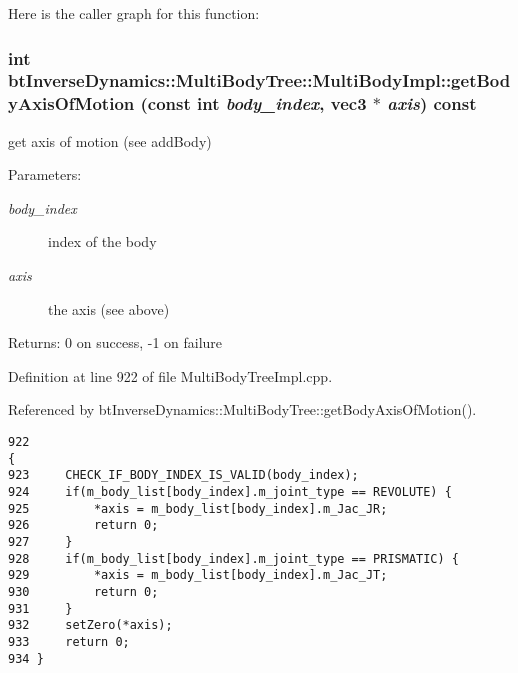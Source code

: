 Here is the caller graph for this function:\hypertarget{classbt_inverse_dynamics_1_1_multi_body_tree_1_1_multi_body_impl_3a0e4f72e0c1f41332e738014fd5f257}{
\subsubsection[getBodyAxisOfMotion]{\setlength{\rightskip}{0pt plus 5cm}int btInverseDynamics::MultiBodyTree::MultiBodyImpl::getBodyAxisOfMotion (const int {\em body\_\-index}, \/  {\bf vec3} $\ast$ {\em axis}) const}}
\label{classbt_inverse_dynamics_1_1_multi_body_tree_1_1_multi_body_impl_3a0e4f72e0c1f41332e738014fd5f257}


get axis of motion (see addBody) \begin{Desc}
\item[Parameters:]
\begin{description}
\item[{\em body\_\-index}]index of the body \item[{\em axis}]the axis (see above) \end{description}
\end{Desc}
\begin{Desc}
\item[Returns:]0 on success, -1 on failure \end{Desc}
 

Definition at line 922 of file MultiBodyTreeImpl.cpp.

Referenced by btInverseDynamics::MultiBodyTree::getBodyAxisOfMotion().

\begin{Code}\begin{verbatim}922                                                                                           {
923     CHECK_IF_BODY_INDEX_IS_VALID(body_index);
924     if(m_body_list[body_index].m_joint_type == REVOLUTE) {
925         *axis = m_body_list[body_index].m_Jac_JR;
926         return 0;
927     }
928     if(m_body_list[body_index].m_joint_type == PRISMATIC) {
929         *axis = m_body_list[body_index].m_Jac_JT;
930         return 0;
931     }
932     setZero(*axis);
933     return 0;
934 }
\end{verbatim}
\end{Code}




